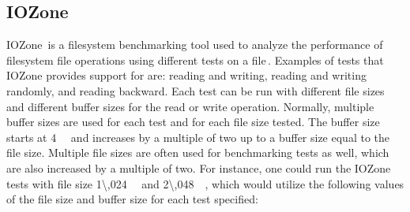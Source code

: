 \subsection{IOZone}
IOZone\,\cite{IozoneFilesystemBenchmark2016} is a filesystem benchmarking tool used to analyze the performance of filesystem file operations using different tests on a file\,\cite{iozoneIozoneFilesystemBenchmark}. Examples of tests that IOZone provides support for are: reading and writing, reading and writing randomly, and reading backward. Each test can be run with different file sizes and different buffer sizes for the read or write operation. Normally, multiple buffer sizes are used for each test and for each file size tested. The buffer size starts at \SI{4}{\kilo\byte} and increases by a multiple of two up to a buffer size equal to the file size. Multiple file sizes are often used for benchmarking tests as well, which are also increased by a multiple of two. For instance, one could run the IOZone tests with file size \SI{1\,024}{\kilo\byte} and \SI{2\,048}{\kilo\byte}, which would utilize the following values of the file size and buffer size for each test specified:
